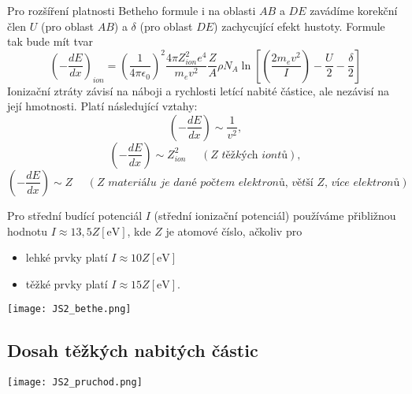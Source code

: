 \documentclass[../../main.tex]{subfiles}
\begin{document}
Pro rozšíření platnosti Betheho formule i na oblasti $AB$ a $DE$ zavádíme korekční člen $U$ (pro oblast $AB$) a $\delta$ (pro oblast $DE$) zachycující efekt hustoty. Formule tak bude mít tvar
\begin{equation}
\left(- \dfrac{dE}{dx} \right)_{ion} = \left( \dfrac{1}{4 \pi \epsilon_0}\right)^2 \dfrac{4\pi  Z_{ion}^2 e^4}{m_e v^2}  \dfrac{Z}{A} \rho N_A \ln \left[ \left( \dfrac{2m_e v^2}{I}\right) - \dfrac{U}{2} - \dfrac{\delta}{2}\right] 
\end{equation}
Ionizační ztráty závisí na náboji a rychlosti letící nabité částice, ale nezávisí na její hmotnosti. Platí následující vztahy:
\begin{equation}
\left( - \dfrac{dE}{dx}\right) \sim \dfrac{1}{v^2} ,
\end{equation}
\begin{equation}
\left( - \dfrac{dE}{dx}\right) \sim Z_{ion}^2 ~~~~~~(\textit{Z těžkých iontů}),
\end{equation}
\begin{equation}
\left( - \dfrac{dE}{dx}\right) \sim Z ~~~~~~ (\textit{Z materiálu je dané počtem elektronů, větší Z, více elektronů})
\end{equation}

Pro střední budící potenciál $I$ (střední ionizační potenciál) používáme přibližnou hodnotu $I \approx 13,5 Z [\mathrm{eV}]$, kde $Z$ je atomové číslo, ačkoliv pro 
\begin{itemize}
     \item lehké prvky platí $I \approx 10 Z [\mathrm{eV}]$
     \item těžké prvky platí $ I \approx 15 Z [\mathrm{eV}]$.
\end{itemize}

\begin{center}
	\texttt{[image: JS2\_bethe.png]}
\end{center}

\subsection{Dosah těžkých nabitých částic}


\begin{center}
	\texttt{[image: JS2\_pruchod.png]}
\end{center}
\end{document}
